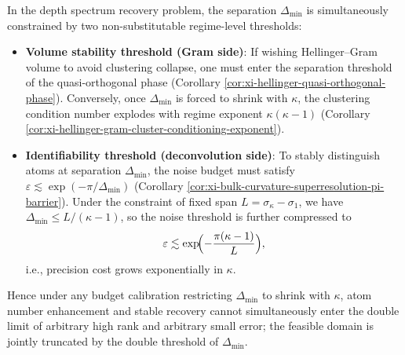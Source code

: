 \begin{remark}\label{rem:xi-bulk-curvature-double-barrier-kappa-separation-precision}
In the depth spectrum recovery problem, the separation \(\Delta_{\min}\) is simultaneously constrained by two non-substitutable regime-level thresholds:
\begin{itemize}
\item \textbf{Volume stability threshold (Gram side)}:
If wishing Hellinger--Gram volume to avoid clustering collapse, one must enter the separation threshold of the quasi-orthogonal phase (Corollary \ref{cor:xi-hellinger-quasi-orthogonal-phase}).
Conversely, once \(\Delta_{\min}\) is forced to shrink with \(\kappa\), the clustering condition number explodes with regime exponent \(\kappa(\kappa-1)\) (Corollary \ref{cor:xi-hellinger-gram-cluster-conditioning-exponent}).
\item \textbf{Identifiability threshold (deconvolution side)}:
To stably distinguish atoms at separation \(\Delta_{\min}\), the noise budget must satisfy
\(
\varepsilon\lesssim \exp(-\pi/\Delta_{\min})
\)
(Corollary \ref{cor:xi-bulk-curvature-superresolution-pi-barrier}).
Under the constraint of fixed span \(L=\sigma_\kappa-\sigma_1\), we have \(\Delta_{\min}\le L/(\kappa-1)\), so the noise threshold is further compressed to
\[
\varepsilon\lesssim \exp\!\Bigl(-\frac{\pi(\kappa-1)}{L}\Bigr),
\]
i.e., precision cost grows exponentially in \(\kappa\).
\end{itemize}
Hence under any budget calibration restricting \(\Delta_{\min}\) to shrink with \(\kappa\), atom number enhancement and stable recovery cannot simultaneously enter the double limit of arbitrary high rank and arbitrary small error; the feasible domain is jointly truncated by the double threshold of \(\Delta_{\min}\).
\end{remark}

